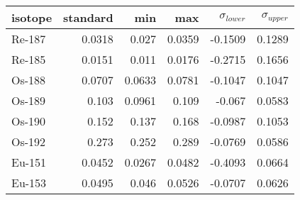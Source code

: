 \begin{tabular}{lrrrrr}
\hline
 isotope   &   standard &    min &    max &   $\sigma_{lower}$ &   $\sigma_{upper}$ \\
\hline
 Re-187    &     0.0318 & 0.027  & 0.0359 &            -0.1509 &             0.1289 \\
 Re-185    &     0.0151 & 0.011  & 0.0176 &            -0.2715 &             0.1656 \\
 Os-188    &     0.0707 & 0.0633 & 0.0781 &            -0.1047 &             0.1047 \\
 Os-189    &     0.103  & 0.0961 & 0.109  &            -0.067  &             0.0583 \\
 Os-190    &     0.152  & 0.137  & 0.168  &            -0.0987 &             0.1053 \\
 Os-192    &     0.273  & 0.252  & 0.289  &            -0.0769 &             0.0586 \\
 Eu-151    &     0.0452 & 0.0267 & 0.0482 &            -0.4093 &             0.0664 \\
 Eu-153    &     0.0495 & 0.046  & 0.0526 &            -0.0707 &             0.0626 \\
\hline
\end{tabular}